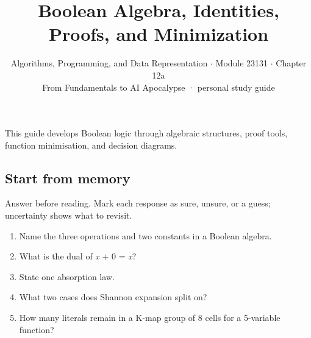 \documentclass[11pt]{article}
\title{\sffamily\bfseries\color{FAUblue}Boolean Algebra, Identities, Proofs, and Minimization}
\author{Algorithms, Programming, and Data Representation \ensuremath{\cdot} Module 23131 \ensuremath{\cdot} Chapter 12a\\[2pt]\small From Fundamentals to AI Apocalypse · personal study guide}
\date{}
\begin{document}
\maketitle
\begingroup\footnotesize\setlength{\parskip}{0pt}\tableofcontents\endgroup
\clearpage

{\large This guide develops Boolean logic through algebraic structures, proof tools, function minimisation, and decision diagrams.}


\begin{keepsection}
\section{Start from memory}

Answer before reading. Mark each response as sure, unsure, or a guess; uncertainty shows what to revisit.

\begin{enumerate}
\item Name the three operations and two constants in a Boolean algebra.
\item What is the dual of \textit{x} + 0 = \textit{x}?
\item State one absorption law.
\item What two cases does Shannon expansion split on?
\item How many literals remain in a K-map group of 8 cells for a 5-variable function?
\end{enumerate}

\end{keepsection}
\end{document}
